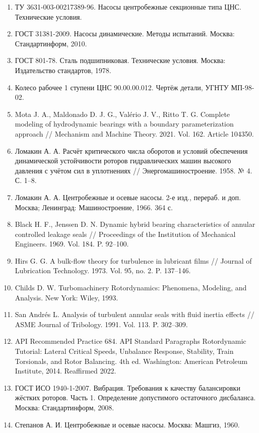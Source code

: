 \documentclass[14pt,a4paper]{extarticle}
\numberwithin{equation}{section}
\numberwithin{figure}{section}
\numberwithin{table}{section}
\begin{document}
\begin{enumerate}
    \item ТУ 3631-003-00217389-96. Насосы центробежные секционные типа ЦНС. Технические условия.
    \item ГОСТ 31381-2009. Насосы динамические. Методы испытаний. Москва: Стандартинформ, 2010.
    \item ГОСТ 801-78. Сталь подшипниковая. Технические условия. Москва: Издательство стандартов, 1978.
    \item Колесо рабочее 1 ступени ЦНС 90.00.00.012. Чертёж детали, УГНТУ МП-98-02.
    \item Mota J. A., Maldonado D. J. G., Valério J. V., Ritto T. G. Complete modeling of hydrodynamic bearings with a boundary parameterization approach // Mechanism and Machine Theory. 2021. Vol. 162. Article 104350.
    \item Ломакин А. А. Расчёт критического числа оборотов и условий обеспечения динамической устойчивости роторов гидравлических машин высокого давления с учётом сил в уплотнениях // Энергомашиностроение. 1958. № 4. С. 1--8.
    \item Ломакин А. А. Центробежные и осевые насосы. 2-е изд., перераб. и доп. Москва; Ленинград: Машиностроение, 1966. 364 с.
    \item Black H. F., Jenssen D. N. Dynamic hybrid bearing characteristics of annular controlled leakage seals // Proceedings of the Institution of Mechanical Engineers. 1969. Vol. 184. P. 92--100.
    \item Hirs G. G. A bulk-flow theory for turbulence in lubricant films // Journal of Lubrication Technology. 1973. Vol. 95, no. 2. P. 137--146.
    \item Childs D. W. Turbomachinery Rotordynamics: Phenomena, Modeling, and Analysis. New York: Wiley, 1993.
    \item San Andrés L. Analysis of turbulent annular seals with fluid inertia effects // ASME Journal of Tribology. 1991. Vol. 113. P. 302--309.
    \item API Recommended Practice 684. API Standard Paragraphs Rotordynamic Tutorial: Lateral Critical Speeds, Unbalance Response, Stability, Train Torsionals, and Rotor Balancing. 4th ed. Washington: American Petroleum Institute, 2014. Reaffirmed 2022.
    \item ГОСТ ИСО 1940-1-2007. Вибрация. Требования к качеству балансировки жёстких роторов. Часть 1. Определение допустимого остаточного дисбаланса. Москва: Стандартинформ, 2008.
    \item Степанов А. И. Центробежные и осевые насосы. Москва: Машгиз, 1960.

\end{enumerate}
\end{document}
